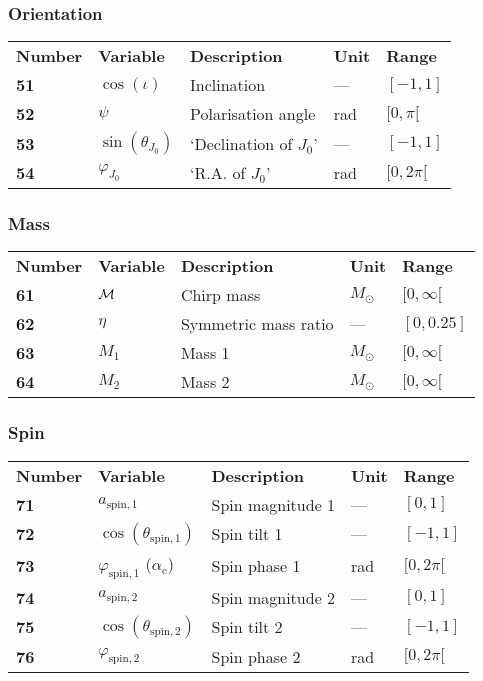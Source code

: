 \documentclass[11pt]{article}
\begin{document}
\subsubsection{Orientation}
\begin{tabular}{lllll}
  \textbf{Number} & \textbf{Variable} & \textbf{Description} & \textbf{Unit} & \textbf{Range} \\
  \textbf{51} & $\cos(\iota)$  & Inclination & --- & $[-1,1]$ \\
  \textbf{52} & $\psi$  & Polarisation angle & rad & $[0,\pi[$ \\
  \textbf{53} & $\sin(\theta_{J_0})$ & `Declination of $J_0$' & --- & $[-1,1]$ \\
  \textbf{54} & $\varphi_{J_0}$  & `R.A. of $J_0$' & rad & $[0,2\pi[$ \\
\end{tabular}

\subsubsection{Mass}
\begin{tabular}{lllll}
  \textbf{Number} & \textbf{Variable} & \textbf{Description} & \textbf{Unit} & \textbf{Range} \\
  \textbf{61} & $\cal{M}$  & Chirp mass & $M_\odot$ & $[0,\infty[$ \\
  \textbf{62} & $\eta$  & Symmetric mass ratio & --- & $[0,0.25]$ \\
  \textbf{63} & $M_1$  & Mass 1 & $M_\odot$ & $[0,\infty[$ \\
  \textbf{64} & $M_2$  & Mass 2 & $M_\odot$ &  $[0,\infty[$ \\
\end{tabular}

\subsubsection{Spin}
\begin{tabular}{lllll}
  \textbf{Number} & \textbf{Variable} & \textbf{Description} & \textbf{Unit} & \textbf{Range} \\
  \textbf{71} & $a_\mathrm{spin,1}$  & Spin magnitude 1 & --- & $[0,1]$ \\
  \textbf{72} & $\cos(\theta_\mathrm{spin,1})$  & Spin tilt 1 & --- & $[-1,1]$ \\
  \textbf{73} & $\varphi_\mathrm{spin,1}$  ($\alpha_\mathrm{c}$)  & Spin phase 1 & rad & $[0,2\pi[$ \\
  \textbf{74} & $a_\mathrm{spin,2}$  & Spin magnitude 2 & --- & $[0,1]$ \\
  \textbf{75} & $\cos(\theta_\mathrm{spin,2})$  & Spin tilt 2 & --- & $[-1,1]$ \\
  \textbf{76} & $\varphi_\mathrm{spin,2}$  & Spin phase 2 & rad & $[0,2\pi[$ \\
\end{tabular}
\end{document}
